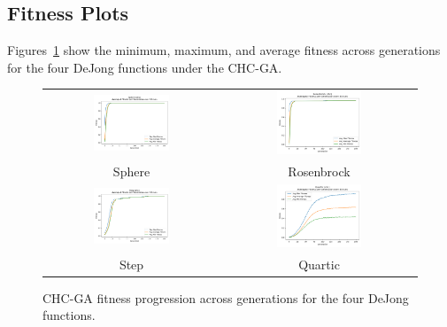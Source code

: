 \documentclass[11pt]{article}
\begin{document}
\newpage
\subsection{Fitness Plots}
Figures~\ref{fig:chc-fitness} show the minimum, maximum, and average fitness across generations for the four DeJong functions under the CHC-GA.

\begin{figure}[H]
    \centering
    \begin{tabular}{cc}
        \includegraphics[width=0.45\textwidth]{plots/sphere_chc_fitness.png} &
        \includegraphics[width=0.45\textwidth]{plots/rosenbrock_chc_fitness.png} \\
        Sphere & Rosenbrock \\
        \includegraphics[width=0.45\textwidth]{plots/step_chc_fitness.png} &
        \includegraphics[width=0.45\textwidth]{plots/quartic_chc_fitness.png} \\
        Step & Quartic \\
    \end{tabular}
    \caption{CHC-GA fitness progression across generations for the four DeJong functions.}
    \label{fig:chc-fitness}
\end{figure}
\clearpage
\end{document}
